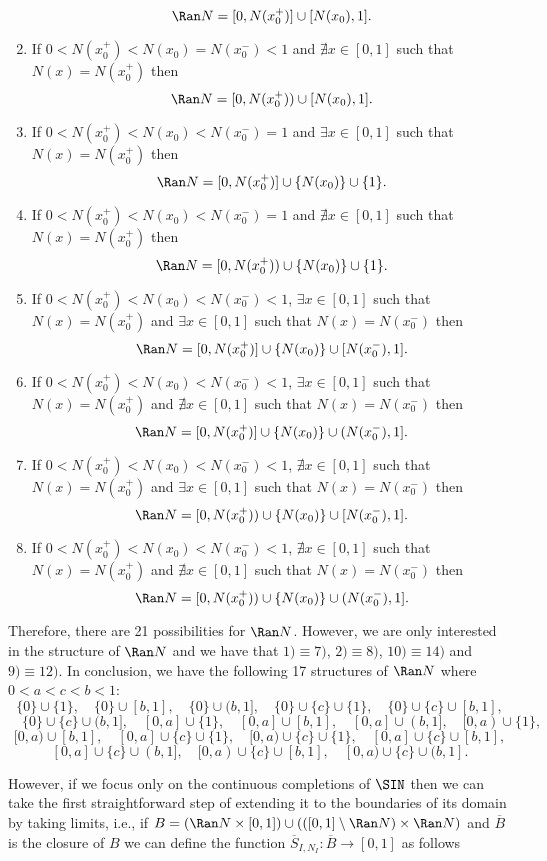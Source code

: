 \begin{remark}
\begin{enumerate}[label=\arabic*)]
		$$\Ran N = [0,N(x_0^+)] \cup [N(x_0),1].$$
		\item If $0<N(x_0^+)<N(x_0)=N(x_0^-)<1$ and $\nexists x \in [0,1]$ such that $N(x)=N(x_0^+)$ then
		$$\Ran N = [0,N(x_0^+)) \cup [N(x_0),1].$$
		\item If $0<N(x_0^+)<N(x_0)<N(x_0^-)=1$ and $\exists x \in [0,1]$ such that $N(x)=N(x_0^+)$ then
		$$\Ran N =[0,N(x_0^+)] \cup \{N(x_0)\} \cup \{1\}.$$
		\item If $0<N(x_0^+)<N(x_0)<N(x_0^-)=1$ and $\nexists x \in [0,1]$ such that $N(x)=N(x_0^+)$ then
		$$\Ran N =[0,N(x_0^+)) \cup \{N(x_0)\} \cup \{1\}.$$
		\item If $0<N(x_0^+)<N(x_0)<N(x_0^-)<1$, $\exists x \in [0,1]$ such that $N(x)=N(x_0^+)$ and $\exists x \in [0,1]$ such that $N(x)=N(x_0^-)$ then
		$$\Ran N =[0,N(x_0^+)] \cup \{N(x_0)\} \cup [N(x_0^-),1].$$
		\item If $0<N(x_0^+)<N(x_0)<N(x_0^-)<1$, $\exists x \in [0,1]$ such that $N(x)=N(x_0^+)$ and $\nexists x \in [0,1]$ such that $N(x)=N(x_0^-)$ then
		$$\Ran N =[0,N(x_0^+)] \cup \{N(x_0)\} \cup (N(x_0^-),1].$$
		\item If $0<N(x_0^+)<N(x_0)<N(x_0^-)<1$, $\nexists x \in [0,1]$ such that $N(x)=N(x_0^+)$ and $\exists x \in [0,1]$ such that $N(x)=N(x_0^-)$ then
		$$\Ran N =[0,N(x_0^+)) \cup \{N(x_0)\} \cup [N(x_0^-),1].$$
		\item If $0<N(x_0^+)<N(x_0)<N(x_0^-)<1$, $\nexists x \in [0,1]$ such that $N(x)=N(x_0^+)$ and $\nexists x \in [0,1]$ such that $N(x)=N(x_0^-)$ then
		$$\Ran N =[0,N(x_0^+)) \cup \{N(x_0)\} \cup (N(x_0^-),1].$$
	\end{enumerate}	
	Therefore, there are 21 possibilities for $\Ran N$. However, we are only interested in the structure of $\Ran N$ and we have that $1) \equiv 7)$, $2) \equiv 8)$, $10) \equiv 14)$ and $9) \equiv 12)$. In conclusion, we have the following 17 structures of $\Ran N$ where $0<a<c<b<1$:	
	$$
	\{0\} \cup \{1\}, \quad \{0\} \cup [b,1], \quad \{0\} \cup (b,1], \quad \{0\} \cup \{c\} \cup \{1\}, \quad \{0\} \cup \{c\} \cup [b,1],
	$$
	$$ 
	\quad \{0\} \cup \{c\} \cup (b,1], \quad [0,a] \cup \{1\}, \quad [0,a] \cup [b,1], \quad [0,a] \cup (b,1], \quad  [0,a) \cup \{1\}, 
	$$
	$$ 
	[0,a) \cup [b,1], \quad [0,a] \cup \{c\} \cup \{1\}, \quad [0,a) \cup \{c\} \cup \{1\}, \quad [0,a] \cup \{c\} \cup [b,1],
	$$
	$$[0,a] \cup \{c\} \cup (b,1], \quad [0,a) \cup \{c\} \cup [b,1], \quad [0,a) \cup \{c\} \cup (b,1].$$
\end{remark}
However, if we focus only on the continuous completions of $\SIN$ then we can take the first straightforward step of extending it to the boundaries of its domain by taking limits, i.e., if $B=(\Ran N \times [0,1]) \cup (([0,1]\setminus \Ran N) \times \Ran N)$ and $\overline{B}$ is the closure of $B$ we can define the function $\overline{S}_{I,N_I}: \overline{B} \to [0,1]$ as follows
